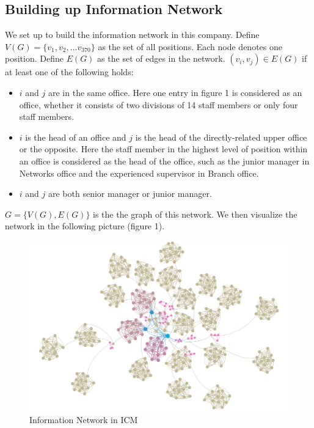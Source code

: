 \documentclass[tcn = 37075, sheet = false, abstract = false]{mcmthesis}
\begin{document}
\subsection{Building up Information Network}

We set up to build the information network in this company. Define $V(G)=\{v_1,v_2,...v_{370}\}$ as the set of all positions. Each node denotes one position. Define $E(G)$ as the set of edges in the network. $(v_i,v_j)\in E(G)$ if at least one of the following holds:

\begin{itemize}
\item $i$ and $j$ are in the same office. Here one entry in figure 1 is considered as an office, whether it consists of two divisions of 14 staff members or only four staff members.
\item $i$ is the head of an office and $j$ is the head of the directly-related upper office or the opposite. Here the staff member in the highest level of position within an office is considered as the head of the office, such as the junior manager in Networks office and the experienced supervisor in Branch office.
\item $i$ and $j$ are both senior manager or junior manager.
\end{itemize}

$G=\{V(G),E(G)\}$ is the the graph of this network. We then visualize the network in the following picture (figure 1).

\begin{figure}[htb!]
\small
\centering
\includegraphics[width=14cm]{figure_2.png}
\caption{Information Network in ICM} \label{fig:Information Network in ICM}
\end{figure}
\end{document}

